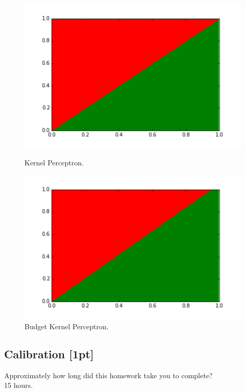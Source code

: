 \documentclass[submit]{harvardml}
\begin{document}
\begin{figure}[!tbp]
	\centering
	\begin{minipage}[b]{0.4\textwidth}
		\includegraphics[width=\textwidth]{k.png}
		\caption{Kernel Perceptron.}
	\end{minipage}
	\hfill
	\begin{minipage}[b]{0.4\textwidth}
		\includegraphics[width=\textwidth]{bk.png}
		\caption{Budget Kernel Perceptron.}
	\end{minipage}
\end{figure}


\newpage

\subsection*{Calibration [1pt]}
Approximately how long did this homework take you to complete? \\
15 hours.
\end{document}
